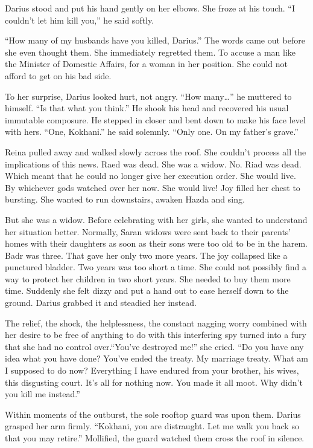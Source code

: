\documentclass{article}
\begin{document}
	Darius stood and put his hand gently on her elbows. She froze at his touch. “I couldn’t let him kill you,” he said softly. 
	
	“How many of my husbands have you killed, Darius.” The words came out before she even thought them. She immediately regretted them. To accuse a man like the Minister of Domestic Affairs, for a woman in her position. She could not afford to get on his bad side.
	
	To her surprise, Darius looked hurt, not angry. “How many…” he muttered to himself. “Is that what you think.” He shook his head and recovered his usual immutable composure. He stepped in closer and bent down to make his face level with hers. “One, Kokhani.” he said solemnly. “Only one. On my father’s grave.”  
	
	Reina pulled away and walked slowly across the roof. She couldn’t process all the implications of this news. Raed was dead. She was a widow. No. Riad was dead. Which meant that he could no longer give her execution order. She would live. By whichever gods watched over her now. She would live! Joy filled her chest to bursting. She wanted to run downstairs, awaken Hazda and sing.
	
	But she was a widow. Before celebrating with her girls, she wanted to understand her situation better. Normally, Saran widows were sent back to their parents’ homes with their daughters as soon as their sons were too old to be in the harem. Badr was three. That gave her only two more years. The joy collapsed like a punctured bladder. Two years was too short a time. She could not possibly find a way to protect her children in two short years. She needed to buy them more time. Suddenly she felt dizzy and put a hand out to ease herself down to the ground. Darius grabbed it and steadied her instead.
	
	The relief, the shock, the helplessness, the constant nagging worry combined with her desire to be free of anything to do with this interfering spy turned into a fury that she had no control over.“You’ve destroyed me!” she cried. “Do you have any idea what you have done? You’ve ended the treaty. My marriage treaty. What am I supposed to do now? Everything I have endured from your brother, his wives, this disgusting court. It’s all for nothing now. You made it all moot. Why didn’t you kill me instead.” 
	
	Within moments of the outburst, the sole rooftop guard was upon them. Darius grasped her arm firmly. “Kokhani, you are distraught. Let me walk you back so that you may retire.” Mollified, the guard watched them cross the roof in silence. 
	
\end{document}
